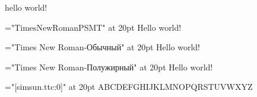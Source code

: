 hello world!


\font\times="TimesNewRomanPSMT" at 20pt\relax
\times Hello world!

\font\times="Times New Roman-Обычный" at 20pt\relax
\times Hello world!

\font\times="Times New Roman-Полужирный" at 20pt\relax
\times Hello world!

\font\songti="[simsun.ttc:0]" at 20pt\relax
\songti ABCDEFGHIJKLMNOPQRSTUVWXYZ

\bye